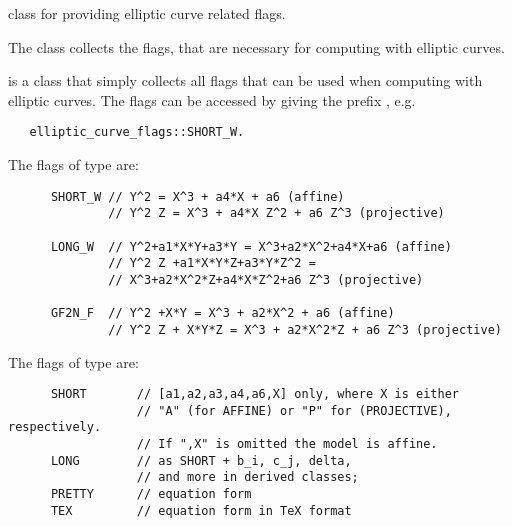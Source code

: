 

\NAME

 \dotfill class for providing elliptic curve related flags.



\ABSTRACT

The class  collects the flags, that are necessary for computing with
elliptic curves.



\DESCRIPTION

 is a class that simply collects all flags that can be used when
computing with elliptic curves.  The flags can be accessed by giving the prefix
, e.g.
\begin{verbatim}
   elliptic_curve_flags::SHORT_W.
\end{verbatim}

The flags of type 
are:
\begin{verbatim}
      SHORT_W // Y^2 = X^3 + a4*X + a6 (affine)
              // Y^2 Z = X^3 + a4*X Z^2 + a6 Z^3 (projective)

      LONG_W  // Y^2+a1*X*Y+a3*Y = X^3+a2*X^2+a4*X+a6 (affine)
              // Y^2 Z +a1*X*Y*Z+a3*Y*Z^2 =
              // X^3+a2*X^2*Z+a4*X*Z^2+a6 Z^3 (projective)

      GF2N_F  // Y^2 +X*Y = X^3 + a2*X^2 + a6 (affine)
              // Y^2 Z + X*Y*Z = X^3 + a2*X^2*Z + a6 Z^3 (projective)
\end{verbatim}


The flags of type  are:
\begin{verbatim}
      SHORT       // [a1,a2,a3,a4,a6,X] only, where X is either
                  // "A" (for AFFINE) or "P" for (PROJECTIVE), respectively.
                  // If ",X" is omitted the model is affine.
      LONG        // as SHORT + b_i, c_j, delta,
                  // and more in derived classes;
      PRETTY      // equation form
      TEX         // equation form in TeX format
\end{verbatim}

